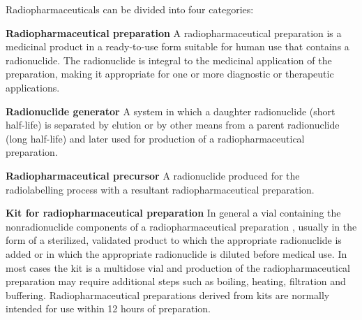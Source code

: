 \documentclass[
]{article}
\begin{document}
Radiopharmaceuticals can be divided into four categories:

\textbf{Radiopharmaceutical preparation} A radiopharmaceutical
preparation is a medicinal product in a ready-to-use form suitable for
human use that contains a radionuclide. The radionuclide is integral to
the medicinal application of the preparation, making it appropriate for
one or more diagnostic or therapeutic applications.

\textbf{Radionuclide generator} A system in which a daughter
radionuclide (short half-life) is separated by elution or by other means
from a parent radionuclide (long half-life) and later used for
production of a radiopharmaceutical preparation.

\textbf{Radiopharmaceutical precursor} A radionuclide produced for the
radiolabelling process with a resultant radiopharmaceutical preparation.

\textbf{Kit for radiopharmaceutical preparation} In general a vial
containing the nonradionuclide components of a radiopharmaceutical
preparation , usually in the form of a sterilized, validated product to
which the appropriate radionuclide is added or in which the appropriate
radionuclide is diluted before medical use. In most cases the kit is a
multidose vial and production of the radiopharmaceutical preparation may
require additional steps such as boiling, heating, filtration and
buffering. Radiopharmaceutical preparations derived from kits are
normally intended for use within 12 hours of preparation.
\end{document}
